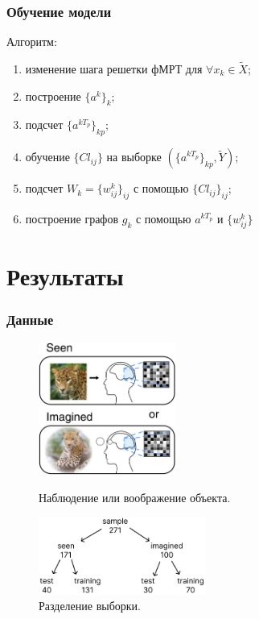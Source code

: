 \documentclass{beamer}
\begin{document}
	\begin{frame} 
		\frametitle{Обучение модели}
		Алгоритм: 
		\begin{enumerate}
			\item изменение шага решетки фМРТ для $\forall x_k \in \widetilde{X}$;
			\item построение $\{a^k\}_k$;
			\item подсчет $\{a^{kT_p}\}_{kp}$;
			\item обучение  $\{Cl_{ij}\}$ на выборке $(\{a^{kT_p}\}_{kp}, \widetilde{Y})$;
			\item подсчет $W_k = \{w_{ij}^k\}_{ij}$ с помощью $\{Cl_{ij}\}_{ij}$;
			\item построение графов $g_k$ с помощью $a^{kT_p}$ и $\{w_{ij}^k\}$
		\end{enumerate}
	\end{frame}

	\section{Результаты}
	\begin{frame} 
		\frametitle{Данные}
		\begin{figure}
			\begin{minipage}{4.5cm}
				\includegraphics[width=4.5cm]{../images/data_1.png}
				\caption{Наблюдение или воображение объекта.} 
				\label{fg:12}
			\end{minipage}\hfill
			\begin{minipage}{5.5cm}
				\includegraphics[width=5.5cm]{../images/data_2.pdf}
				\caption{Разделение выборки.}
				\label{fg:13}
			\end{minipage}	
		\end{figure}
	\end{frame}
\end{document}
